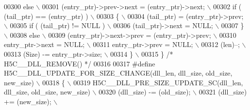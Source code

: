 \begin{DoxyCode}
00300 \textcolor{preprocessor}{       else                                                                 \(\backslash\)}
00301 \textcolor{preprocessor}{          (entry\_ptr)->prev->next = (entry\_ptr)->next;                      \(\backslash\)}
00302 \textcolor{preprocessor}{       if ( (tail\_ptr) == (entry\_ptr) )                                     \(\backslash\)}
00303 \textcolor{preprocessor}{       \{                                                                    \(\backslash\)}
00304 \textcolor{preprocessor}{          (tail\_ptr) = (entry\_ptr)->prev;                                   \(\backslash\)}
00305 \textcolor{preprocessor}{          if ( (tail\_ptr) != NULL )                                         \(\backslash\)}
00306 \textcolor{preprocessor}{             (tail\_ptr)->next = NULL;                                       \(\backslash\)}
00307 \textcolor{preprocessor}{       \}                                                                    \(\backslash\)}
00308 \textcolor{preprocessor}{       else                                                                 \(\backslash\)}
00309 \textcolor{preprocessor}{          (entry\_ptr)->next->prev = (entry\_ptr)->prev;                      \(\backslash\)}
00310 \textcolor{preprocessor}{       entry\_ptr->next = NULL;                                              \(\backslash\)}
00311 \textcolor{preprocessor}{       entry\_ptr->prev = NULL;                                              \(\backslash\)}
00312 \textcolor{preprocessor}{       (len)--;                                                             \(\backslash\)}
00313 \textcolor{preprocessor}{       (Size) -= entry\_ptr->size;                                           \(\backslash\)}
00314 \textcolor{preprocessor}{    \}                                                                       \(\backslash\)}
00315 \textcolor{preprocessor}{\} }\textcolor{comment}{/* H5C\_\_DLL\_REMOVE() */}\textcolor{preprocessor}{}
00316 
00317 \textcolor{preprocessor}{#define H5C\_\_DLL\_UPDATE\_FOR\_SIZE\_CHANGE(dll\_len, dll\_size, old\_size, new\_size) \(\backslash\)}
00318 \textcolor{preprocessor}{\{                                                                              \(\backslash\)}
00319 \textcolor{preprocessor}{    H5C\_\_DLL\_PRE\_SIZE\_UPDATE\_SC(dll\_len, dll\_size, old\_size, new\_size)         \(\backslash\)}
00320 \textcolor{preprocessor}{    (dll\_size) -= (old\_size);                                                  \(\backslash\)}
00321 \textcolor{preprocessor}{    (dll\_size) += (new\_size);                                                  \(\backslash\)}

\end{DoxyCode}
